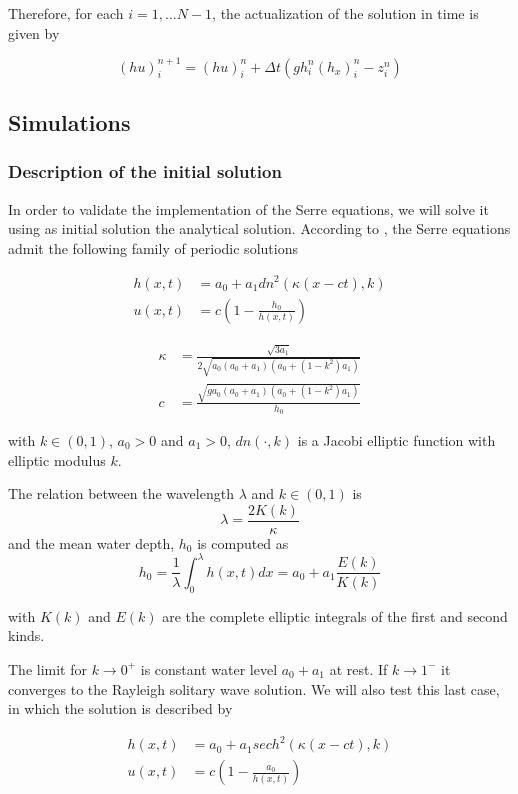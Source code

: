 \indent Therefore, for each $i=1,...N-1$, the actualization of the solution in time is given by

\begin{equation}
(hu)_i^{n+1} = (hu)_i^n + \Delta t \left(gh_i^n(h_x)_i^n - z_i^n \right)
\end{equation}

\subsection{Simulations}

\subsubsection{Description of the initial solution}

\indent In order to validate the implementation of the Serre equations, we will solve it using as initial solution the analytical solution. According to \cite{CarterCienfuegos2011}, the Serre equations admit the following family of periodic solutions

\begin{align*}
    h(x,t) &= a_0 + a_1 dn^2(\kappa(x-ct),k) \\
    u(x,t) &= c\left( 1 - \frac{h_0}{h(x,t)}\right)
\end{align*}

\begin{align*}
    \kappa &= \frac{\sqrt{3a_1}}{2\sqrt{a_0(a_0+a_1)(a_0+(1-k^2)a_1)}} \\
    c &= \frac{\sqrt{g a_0(a_0+a_1)(a_0+(1-k^2)a_1)}}{h_0}
\end{align*}

\noindent with $k\in(0,1)$, $a_0>0$ and $a_1>0$, $dn(\cdot,k)$ is a Jacobi elliptic function with elliptic modulus $k$.

\indent The relation between the wavelength $\lambda$ and $k\in(0,1)$ is $$\lambda = \frac{2K(k)}{\kappa}$$ and the mean water depth, $h_0$ is computed as $$h_0 = \frac{1}{\lambda}\int_{0}^\lambda h(x,t)dx = a_0 + a_1 \frac{E(k)}{K(k)}$$

\noindent with $K(k)$ and $E(k)$ are the complete elliptic integrals of the first and second kinds.

\indent The limit for $k\to0^+$ is constant water level $a_0+a_1$ at rest. If $k\to1^-$ it converges to the Rayleigh solitary wave solution. We will also test this last case, in which the solution is described by

\begin{align*}
    h(x,t) &= a_0 + a_1 sech^2(\kappa(x-ct),k) \\
    u(x,t) &= c\left( 1 - \frac{a_0}{h(x,t)}\right)
\end{align*}

